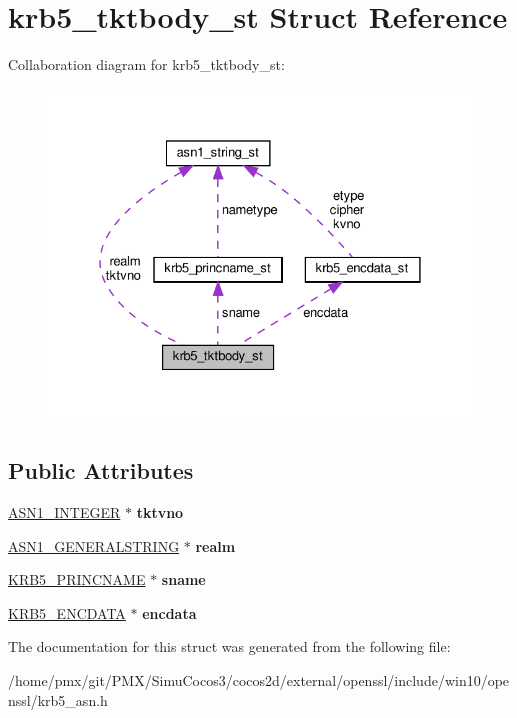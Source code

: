 \hypertarget{structkrb5__tktbody__st}{}\section{krb5\+\_\+tktbody\+\_\+st Struct Reference}
\label{structkrb5__tktbody__st}


Collaboration diagram for krb5\+\_\+tktbody\+\_\+st\+:
\nopagebreak
\begin{figure}[H]
\begin{center}
\leavevmode
\includegraphics[width=328pt]{structkrb5__tktbody__st__coll__graph}
\end{center}
\end{figure}
\subsection*{Public Attributes}
\begin{DoxyCompactItemize}
\item 
\mbox{\label{structkrb5__tktbody__st_ab08375dff74a8c2325a6f513a57db966}} 
\hyperlink{structasn1__string__st}{A\+S\+N1\+\_\+\+I\+N\+T\+E\+G\+ER} $\ast$ {\bfseries tktvno}
\item 
\mbox{\label{structkrb5__tktbody__st_afda45dfe18a1811139bec0b5ef92f279}} 
\hyperlink{structasn1__string__st}{A\+S\+N1\+\_\+\+G\+E\+N\+E\+R\+A\+L\+S\+T\+R\+I\+NG} $\ast$ {\bfseries realm}
\item 
\mbox{\label{structkrb5__tktbody__st_a2348d5ac085e82390778933a463d9333}} 
\hyperlink{structkrb5__princname__st}{K\+R\+B5\+\_\+\+P\+R\+I\+N\+C\+N\+A\+ME} $\ast$ {\bfseries sname}
\item 
\mbox{\label{structkrb5__tktbody__st_af8a772eee7b3423d1d48926ca5dfea20}} 
\hyperlink{structkrb5__encdata__st}{K\+R\+B5\+\_\+\+E\+N\+C\+D\+A\+TA} $\ast$ {\bfseries encdata}
\end{DoxyCompactItemize}


The documentation for this struct was generated from the following file\+:\begin{DoxyCompactItemize}
\item 
/home/pmx/git/\+P\+M\+X/\+Simu\+Cocos3/cocos2d/external/openssl/include/win10/openssl/krb5\+\_\+asn.\+h\end{DoxyCompactItemize}
